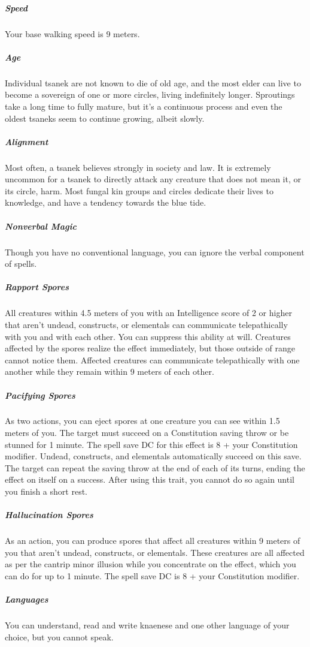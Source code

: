 \subparagraph{Speed} Your base walking speed is 9 meters.

\subparagraph{Age} Individual tsanek are not known to die of old age, and the most elder can live to become a sovereign of one or more circles, living indefinitely longer.
Sproutings take a long time to fully mature, but it's a continuous process and even the oldest tsaneks seem to continue growing, albeit slowly.

\subparagraph{Alignment} Most often, a tsanek believes strongly in society and law.
It is extremely uncommon for a tsanek to directly attack any creature that does not mean it, or its circle, harm.
Most fungal kin groups and circles dedicate their lives to knowledge, and have a tendency towards the blue tide.

\subparagraph{Nonverbal Magic} Though you have no conventional language, you can ignore the verbal component of spells.

\subparagraph{Rapport Spores} All creatures within 4.5 meters of you with an Intelligence score of 2 or higher that aren't undead, constructs, or elementals can communicate telepathically with you and with each other.
You can suppress this ability at will.
Creatures affected by the spores realize the effect immediately, but those outside of range cannot notice them.
Affected creatures can communicate telepathically with one another while they remain within 9 meters of each other.

\subparagraph{Pacifying Spores} As two actions, you can eject spores at one creature you can see within 1.5 meters of you.
The target must succeed on a Constitution saving throw or be stunned for 1 minute.
The spell save DC for this effect is 8 + your Constitution modifier.
Undead, constructs, and elementals automatically succeed on this save.
The target can repeat the saving throw at the end of each of its turns, ending the effect on itself on a success.
After using this trait, you cannot do so again until you finish a short rest.

\subparagraph{Hallucination Spores} As an action, you can produce spores that affect all creatures within 9 meters of you that aren't undead, constructs, or elementals.
These creatures are all affected as per the cantrip minor illusion while you concentrate on the effect, which you can do for up to 1 minute.
The spell save DC is 8 + your Constitution modifier.

\subparagraph{Languages} You can understand, read and write knaenese and one other language of your choice, but you cannot speak.

